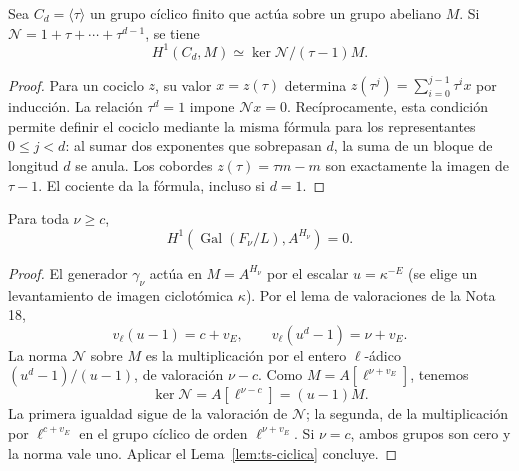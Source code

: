\begin{lema}
\label{lem:ts-ciclica}
Sea $C_d=\langle\tau\rangle$ un grupo cíclico finito que actúa sobre un grupo abeliano $M$. Si $\mathcal N=1+\tau+\cdots+\tau^{d-1}$, se tiene
\begin{equation}
 H^1(C_d,M)\simeq\ker\mathcal N/(\tau-1)M.
 \label{eq:ts-ciclica}
\end{equation}
\end{lema}
\begin{proof}
Para un cociclo $z$, su valor $x=z(\tau)$ determina $z(\tau^j)=\sum_{i=0}^{j-1}\tau^i x$ por inducción. La relación $\tau^d=1$ impone $\mathcal N x=0$. Recíprocamente, esta condición permite definir el cociclo mediante la misma fórmula para los representantes $0\le j<d$: al sumar dos exponentes que sobrepasan $d$, la suma de un bloque de longitud $d$ se anula. Los cobordes $z(\tau)=\tau m-m$ son exactamente la imagen de $\tau-1$. El cociente da la fórmula, incluso si $d=1$.
\end{proof}

\begin{proposicion}
\label{prop:ts-nucleo}
Para toda $\nu\ge c$,
\begin{equation}
 H^1(\operatorname{Gal}(F_\nu/L),A^{H_\nu})=0.
 \label{eq:ts-nucleo}
\end{equation}
\end{proposicion}
\begin{proof}
El generador $\gamma_\nu$ actúa en $M=A^{H_\nu}$ por el escalar $u=\kappa^{-E}$ (se elige un levantamiento de imagen ciclotómica $\kappa$). Por el lema de valoraciones de la Nota 18,
\begin{equation}
 v_\ell(u-1)=c+v_E,\qquad v_\ell(u^d-1)=\nu+v_E.
 \label{eq:ts-val}
\end{equation}
La norma $\mathcal N$ sobre $M$ es la multiplicación por el entero $\ell$-ádico $(u^d-1)/(u-1)$, de valoración $\nu-c$. Como $M=A[\ell^{\nu+v_E}]$, tenemos
\begin{equation}
 \ker\mathcal N=A[\ell^{\nu-c}]=(u-1)M.
 \label{eq:ts-igualdad}
\end{equation}
La primera igualdad sigue de la valoración de $\mathcal N$; la segunda, de la multiplicación por $\ell^{c+v_E}$ en el grupo cíclico de orden $\ell^{\nu+v_E}$. Si $\nu=c$, ambos grupos son cero y la norma vale uno. Aplicar el Lema~\ref{lem:ts-ciclica} concluye.
\end{proof}


